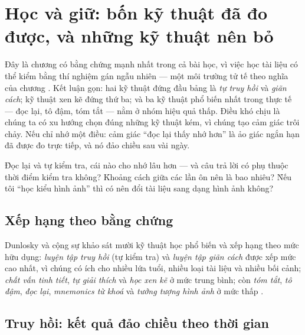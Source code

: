 \documentclass[../hieu-suat.tex]{subfiles}
\begin{document}
\chapter{Học và giữ: bốn kỹ thuật đã đo được, và những kỹ thuật nên bỏ}

\begin{tomtat}
Đây là chương có bằng chứng mạnh nhất trong cả bài học, vì việc học tài liệu có thể kiểm bằng thí nghiệm gán ngẫu nhiên --- một môi trường tử tế theo nghĩa của chương . Kết luận gọn: hai kỹ thuật đứng đầu bảng là \emph{tự truy hồi} và \emph{giãn cách}; kỹ thuật xen kẽ đứng thứ ba; và ba kỹ thuật phổ biến nhất trong thực tế --- đọc lại, tô đậm, tóm tắt --- nằm ở nhóm hiệu quả thấp. Điều khó chịu là chúng ta có xu hướng chọn đúng những kỹ thuật kém, vì chúng tạo cảm giác trôi chảy. Nếu chỉ nhớ một điều: cảm giác ``đọc lại thấy nhớ hơn'' là ảo giác ngắn hạn đã được đo trực tiếp, và nó đảo chiều sau vài ngày.
\end{tomtat}

\begin{khoigoi}
\h{Đọc lại và tự kiểm tra, cái nào cho nhớ lâu hơn --- và câu trả lời có phụ thuộc thời điểm kiểm tra không?}
\h{Khoảng cách giữa các lần ôn nên là bao nhiêu?}
\h{Nếu tôi ``học kiểu hình ảnh'' thì có nên đổi tài liệu sang dạng hình ảnh không?}
\end{khoigoi}

\section{Xếp hạng theo bằng chứng}

Dunlosky và cộng sự \cite{dunlosky2013} khảo sát mười kỹ thuật học phổ biến và xếp hạng theo mức hữu dụng: \emph{luyện tập truy hồi} (tự kiểm tra) và \emph{luyện tập giãn cách} được xếp mức cao nhất, vì chúng có ích cho nhiều lứa tuổi, nhiều loại tài liệu và nhiều bối cảnh; \emph{chất vấn tinh tiết}, \emph{tự giải thích} và \emph{học xen kẽ} ở mức trung bình; còn \emph{tóm tắt}, \emph{tô đậm}, \emph{đọc lại}, \emph{mnemonics từ khoá} và \emph{tưởng tượng hình ảnh} ở mức thấp \nD{}.

\section{Truy hồi: kết quả đảo chiều theo thời gian}
\end{document}
